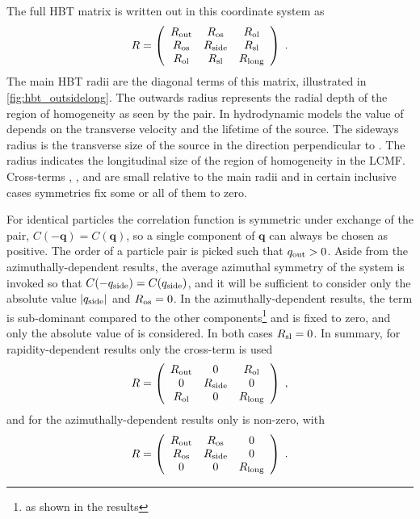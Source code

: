 The full \ac{HBT} matrix is written out in this coordinate system as
\begin{equation}
  \label{eq:r_matrix_full}
  R = \left( \begin{array}{ccc}
  R_{\mathrm{out}} & R_{\mathrm{os}} & R_{\mathrm{ol}} \\
  R_{\mathrm{os}} & R_{\mathrm{side}} & R_{\mathrm{sl}} \\
  R_{\mathrm{ol}} & R_{\mathrm{sl}} & R_{\mathrm{long}}
  \end{array} \right) \; .
\end{equation}
The main \ac{HBT} radii are the diagonal terms of this matrix, illustrated in \cref{fig:hbt_outsidelong}.
The outwards radius \Rout represents the radial depth of the region of homogeneity as seen by the pair.
In hydrodynamic models the value of \Rout depends on the transverse velocity and the lifetime of the source.
The sideways radius \Rside is the transverse size of the source in the direction perpendicular to \kt.
The radius \Rlong indicates the longitudinal size of the region of homogeneity in the \ac{LCMF}.
Cross-terms \Ros, \Rol, and \Rsl are small relative to the main radii and in certain inclusive cases symmetries fix some or all of them to zero.

For identical particles the correlation function is symmetric under exchange of the pair, \(C(-\mathbf{q}) = C(\mathbf{q})\), so a single component of $\mathbf{q}$ can always be chosen as positive.
The order of a particle pair is picked such that $q_{\mathrm{out}} > 0$.
Aside from the azimuthally-dependent results, the average azimuthal symmetry of the \pPb system is invoked so that $C(-q_{\mathrm{side}}) = C(q_{\mathrm{side}})$, and it will be sufficient to consider only the absolute value $|q_{\mathrm{side}}|$ and $R_{\mathrm{os}} = 0$.
In the azimuthally-dependent results, the \Rol term is sub-dominant compared to the other components\footnote{as shown in the results} and is fixed to zero, and only the absolute value of \qlong is considered.
In both cases $R_{\mathrm{sl}} = 0$.
In summary, for rapidity-dependent results only the \Rol cross-term is used
\[
R = \left( \begin{array}{ccc}
  R_{\mathrm{out}} & 0 & R_{\mathrm{ol}} \\
  0 & R_{\mathrm{side}} & 0 \\
  R_{\mathrm{ol}} & 0 & R_{\mathrm{long}}
\end{array} \right) \;,
\]
and for the azimuthally-dependent results only \Ros is non-zero, with
\[
R = \left( \begin{array}{ccc}
  R_{\mathrm{out}} & R_{\mathrm{os}} & 0 \\
  R_{\mathrm{os}} & R_{\mathrm{side}} & 0 \\
  0 & 0 & R_{\mathrm{long}}
\end{array} \right) \; .
\]

